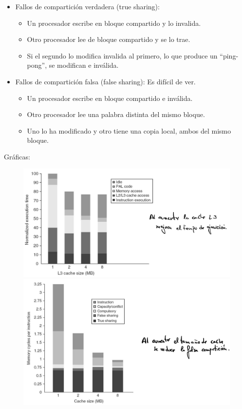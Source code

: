 \documentclass[12pt, twoside, openright]{report} %
\begin{document}
    \begin{itemize}
    
    \item
      Fallos de compartición verdadera (true sharing):

      \begin{itemize}
      
      \item
        Un procesador escribe en bloque compartido y lo invalida.
      \item
        Otro procesador lee de bloque compartido y se lo trae.
      \item
        Si el segundo lo modifica invalida al primero, lo que produce
        un ``ping-pong'', se modifican e inválida.
      \end{itemize}
    \item
      Fallos de compartición falsa (false sharing): Es difícil de ver.

      \begin{itemize}
      
      \item
        Un procesador escribe en bloque compartido e inválida.
      \item
        Otro procesador lee una palabra distinta del mismo bloque.
      \item
        Uno lo ha modificado y otro tiene una copia local, ambos del
        mismo bloque.
      \end{itemize}
    \end{itemize}
\pagebreak
    Gráficas:
    \begin{figure}[H]
      {\includegraphics[scale=.15]{Untitled 53.png}\includegraphics[scale=.13]{Untitled 54.png}}
    \end{figure}
\end{document}
